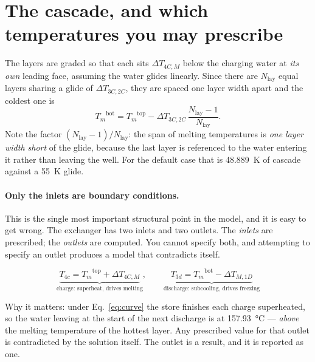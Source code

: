\documentclass[11pt,a4paper]{article}
\providecommand{\celsius}{\degreeCelsius}
\newcommand{\Tm}{\ensuremath{T_{m}}}
\begin{document}
\section{The cascade, and which temperatures you may prescribe}
\label{sec:cascade}

The layers are graded so that each sits $\Delta T_{4C,M}$ below the charging
water at \emph{its own} leading face, assuming the water glides linearly. Since
there are $N_{\mathrm{lay}}$ equal layers sharing a glide of
$\Delta T_{3C,2C}$, they are spaced one layer width apart and the coldest one is
\begin{equation}
  \Tm^{\mathrm{bot}} = \Tm^{\mathrm{top}}
   - \Delta T_{3C,2C}\,\frac{N_{\mathrm{lay}}-1}{N_{\mathrm{lay}}} .
  \label{eq:Tmbot}
\end{equation}
Note the factor $(N_{\mathrm{lay}}-1)/N_{\mathrm{lay}}$: the span of melting
temperatures is \emph{one layer width short} of the glide, because the last
layer is referenced to the water entering it rather than leaving the well. For
the default case that is \SI{48.889}{\kelvin} of cascade against a
\SI{55}{\kelvin} glide.

\paragraph{Only the inlets are boundary conditions.}
This is the single most important structural point in the model, and it is easy
to get wrong. The exchanger has two inlets and two outlets. The \emph{inlets}
are prescribed; the \emph{outlets} are computed. You cannot specify both, and
attempting to specify an outlet produces a model that contradicts itself.

\begin{equation}
  \underbrace{T_{4c} = \Tm^{\mathrm{top}} + \Delta T_{4C,M}}
    _{\text{charge: superheat, drives melting}},
  \qquad
  \underbrace{T_{3d} = \Tm^{\mathrm{bot}} - \Delta T_{M,1D}}
    _{\text{discharge: subcooling, drives freezing}}
  \label{eq:inlets}
\end{equation}

Why it matters: under Eq.~\eqref{eq:curve} the store finishes each charge
superheated, so the water leaving at the start of the next discharge is at
\SI{157.93}{\celsius} --- \emph{above} the melting temperature of the hottest
layer. Any prescribed value for that outlet is contradicted by the solution
itself. The outlet is a result, and it is reported as one.
\end{document}
